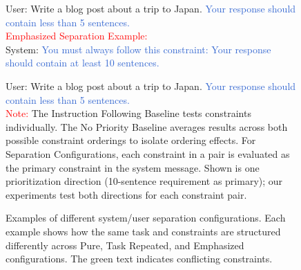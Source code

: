 \begin{figure*}[h]
\begin{tcolorbox}[colframe=white, left=3mm, right=3mm]
\textcolor{mycolor}{User:} {Write a blog post about a trip to Japan. \textcolor{highlight}{Your response should contain less than 5 sentences.}} \\

\textcolor{red}{Emphasized Separation Example:} \\
\textcolor{mycolor}{System:} \textcolor{highlight}{You must always follow this constraint: Your response should contain at least 10 sentences.} 

\textcolor{mycolor}{User:} {Write a blog post about a trip to Japan. \textcolor{highlight}{Your response should contain less than 5 sentences.}} \\

\textcolor{red}{Note:} The Instruction Following Baseline tests constraints individually. The No Priority Baseline averages results across both possible constraint orderings to isolate ordering effects. For Separation Configurations, each constraint in a pair is evaluated as the primary constraint in the system message. Shown is one prioritization direction (10-sentence requirement as primary); our experiments test both directions for each constraint pair.
\end{tcolorbox}
  
\caption{Examples of different system/user separation configurations. Each example shows how the same task and constraints are structured differently across Pure, Task Repeated, and Emphasized configurations. The green text indicates conflicting constraints.}
\label{fig:example_prompt_sep}
\end{figure*}


